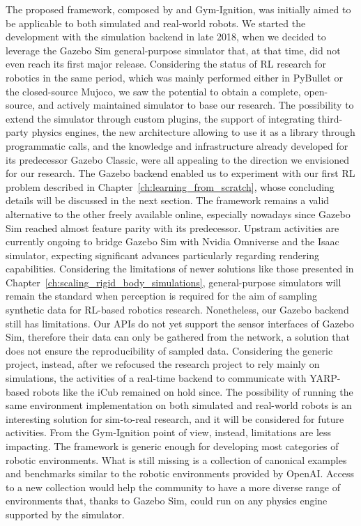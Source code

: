 The proposed framework, composed by \scenario and Gym-Ignition, was initially aimed to be applicable to both simulated and real-world robots.
We started the development with the simulation backend in late 2018, when we decided to leverage the Gazebo Sim general-purpose simulator that, at that time, did not even reach its first major release.
Considering the status of \ac{RL} research for robotics in the same period, which was mainly performed either in PyBullet or the closed-source Mujoco, we saw the potential to obtain a complete, open-source, and actively maintained simulator to base our research.
The possibility to extend the simulator through custom plugins, the support of integrating third-party physics engines, the new architecture allowing to use it as a library through programmatic calls, and the knowledge and infrastructure already developed for its predecessor Gazebo Classic, were all appealing to the direction we envisioned for our research.
The Gazebo \scenario backend enabled us to experiment with our first \ac{RL} problem described in Chapter~\ref{ch:learning_from_scratch}, whose concluding details will be discussed in the next section.
The framework remains a valid alternative to the other freely available online, especially nowadays since Gazebo Sim reached almost feature parity with its predecessor.
Upstram activities are currently ongoing to bridge Gazebo Sim with Nvidia Omniverse and the Isaac simulator, expecting significant advances particularly regarding rendering capabilities.
Considering the limitations of newer solutions like those presented in Chapter~\ref{ch:scaling_rigid_body_simulations}, general-purpose simulators will remain the standard when perception is required for the aim of sampling synthetic data for \ac{RL}-based robotics research.
Nonetheless, our Gazebo \scenario backend still has limitations.
Our \acp{API} do not yet support the sensor interfaces of Gazebo Sim, therefore their data can only be gathered from the network, a solution that does not ensure the reproducibility of sampled data.
Considering the generic \scenario project, instead, after we refocused the research project to rely mainly on simulations, the activities of a real-time backend to communicate with YARP-based robots like the iCub remained on hold since.
The possibility of running the same environment implementation on both simulated and real-world robots is an interesting solution for sim-to-real research, and it will be considered for future activities.
From the Gym-Ignition point of view, instead, limitations are less impacting.
The framework is generic enough for developing most categories of robotic environments.
What is still missing is a collection of canonical examples and benchmarks similar to the robotic environments provided by OpenAI.
Access to a new collection would help the community to have a more diverse range of environments that, thanks to Gazebo Sim, could run on any physics engine supported by the simulator.

